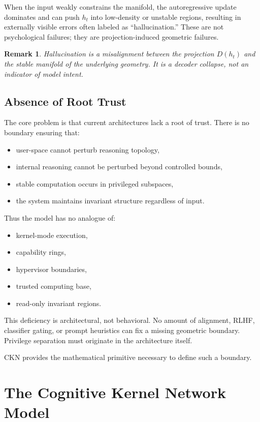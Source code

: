 \documentclass[11pt,a4paper]{article}
\newtheorem*{remark}{Remark}
\begin{document}
When the input weakly constrains the manifold, the autoregressive update dominates and can push $h_t$ into low-density or unstable regions, resulting in externally visible errors often labeled as ``hallucination.'' These are not psychological failures; they are projection-induced geometric failures.

\begin{remark}
Hallucination is a misalignment between the projection $D(h_t)$ and the stable manifold of the underlying geometry. It is a decoder collapse, not an indicator of model intent.
\end{remark}

\subsection{Absence of Root Trust}

The core problem is that current architectures lack a root of trust. There is no boundary ensuring that:
\begin{itemize}
    \item user-space cannot perturb reasoning topology,
    \item internal reasoning cannot be perturbed beyond controlled bounds,
    \item stable computation occurs in privileged subspaces,
    \item the system maintains invariant structure regardless of input.
\end{itemize}

Thus the model has no analogue of:
\begin{itemize}
    \item kernel-mode execution,
    \item capability rings,
    \item hypervisor boundaries,
    \item trusted computing base,
    \item read-only invariant regions.
\end{itemize}

This deficiency is architectural, not behavioral. No amount of alignment, RLHF, classifier gating, or prompt heuristics can fix a missing geometric boundary. Privilege separation must originate in the architecture itself.

CKN provides the mathematical primitive necessary to define such a boundary.

\section{The Cognitive Kernel Network Model}
\end{document}
